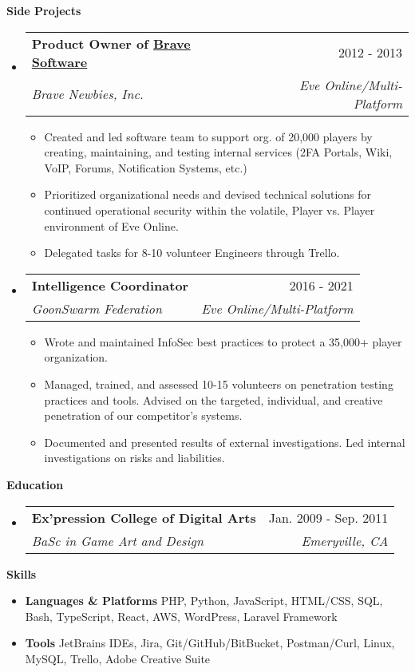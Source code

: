 \documentclass[letterpaper,10pt]{article}[leftmargin=*]
\makeatletter
\def \entryspacing {-0pt}
\renewcommand{\section}[2]{\vspace{5pt}
  \colorbox{secondary}{\color{white}\raggedbottom\normalsize\textbf{{#1}{\hspace{7pt}#2}}}
}
\newcommand{\resumeEntryStart}{\begin{itemize}[leftmargin=2.5mm]}
\newcommand{\resumeEntryEnd}{\end{itemize}\vspace{\entryspacing}}
\newcommand{\resumeItemListStart}{\begin{itemize}[leftmargin=4.5mm]}
\newcommand{\resumeItemListEnd}{\end{itemize}}
\newcommand{\resumeItem}[1]{
  \item\small{
    {#1 \vspace{-2pt}}
  }
}
\newcommand{\resumeEntryTSDL}[4]{
  \vspace{-1pt}\item[]
    \begin{tabularx}{0.97\textwidth}{X@{\hspace{60pt}}r}
      \textbf{\color{primary}#1} & {\firabook\color{accent}\small#2} \\
      \textit{\color{accent}\small#3} & \textit{\color{accent}\small#4} \\
    \end{tabularx}\vspace{-6pt}
}
\newcommand{\resumeEntryS}[2]{
  \item[]\small{
    \textbf{\color{primary}#1 }{ #2 \vspace{-6pt}}
  }
}
\makeatother
\begin{document}
\section{\faFlask}{Side Projects}

  \resumeEntryStart
    \resumeEntryTSDL
      {Product Owner of \href{https://github.com/bravecollective}{Brave Software} }{2012 - 2013}
      {Brave Newbies, Inc.}{Eve Online/Multi-Platform}
    \resumeItemListStart
      \resumeItem {Created and led software team to support org. of 20,000 players by creating, maintaining, and testing internal services (2FA Portals, Wiki, VoIP, Forums, Notification Systems, etc.)}
      \resumeItem {Prioritized organizational needs and devised technical solutions for continued operational security within the volatile, Player vs. Player environment of Eve Online.}
      \resumeItem {Delegated tasks for 8-10 volunteer Engineers through Trello.}
    \resumeItemListEnd
  \resumeEntryEnd

  \resumeEntryStart
    \resumeEntryTSDL
      {Intelligence Coordinator}{2016 - 2021}
      {GoonSwarm Federation}{Eve Online/Multi-Platform}
    \resumeItemListStart
      \resumeItem {Wrote and maintained InfoSec best practices to protect a 35,000+ player organization. }
      \resumeItem {Managed, trained, and assessed 10-15 volunteers on penetration testing practices and tools. Advised on the targeted, individual, and creative penetration of our competitor's systems. }
      \resumeItem{Documented and presented results of external investigations. Led internal investigations on risks and liabilities. }
    \resumeItemListEnd
  \resumeEntryEnd

\section{\faGraduationCap}{Education}

  \resumeEntryStart
    \resumeEntryTSDL
      {Ex’pression College of Digital Arts}{Jan. 2009 - Sep. 2011}
      {BaSc in Game Art and Design}{Emeryville, CA}
  \resumeEntryEnd

\section{\faGears}{Skills}
 \resumeEntryStart
  \resumeEntryS{Languages \& Platforms} { PHP, Python, JavaScript, HTML/CSS, SQL, Bash, TypeScript, React, AWS, WordPress, Laravel Framework}
  \resumeEntryS{Tools } {JetBrains IDEs, Jira, Git/GitHub/BitBucket, Postman/Curl, Linux, MySQL, Trello, Adobe Creative Suite}
 \resumeEntryEnd
\end{document}
